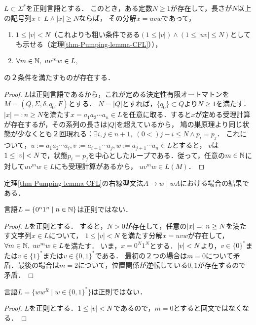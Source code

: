 \documentclass[uplatex, dvipdfmx]{jsreport}
\begin{document}
\begin{theorem}\label{thm-Pumpimg-lemma}
    $L\subset\Sigma^*$を正則言語とする．
    このとき，ある定数$N\ge 1$が存在して，長さが$N$以上の記号列$x\in L\land |x|\ge N$ならば，
    その分解$x=uvw$であって，
    \begin{enumerate}
        \item $1\le |v|<N$（これよりも粗い条件である$(1\le |v|)\land (1\le|uv|\le N)$としても示せる（定理\ref{thm-Pumping-lemma-CFL}）），
        \item $\forall m\in\mathbb{N},\; uv^mw\in L$,
    \end{enumerate}
    の２条件を満たすものが存在する．
\end{theorem}
\begin{proof}
    $L$は正則言語であるから，これが定める決定性有限オートマトンを$M=(Q,\Sigma,\delta,q_0,F)$とする．
    $N=|Q|$とすれば，$\{q_0\}\subset Q$より$N\ge 1$を満たす．
    $|x|=:n\ge N$を満たす$x=a_1a_2\cdots a_n\in L$を任意に取る．すると$x$が定める受理計算が存在するが，その系列の長さは$|Q|$を超えているから，
    鳩の巣原理より同じ状態が少なくとも２回現れる：$\exists i,j\in n+1,\;(0<)j-i\le N\land p_i=p_j$．
    これについて，$u:=a_1a_2\cdots a_i,v:=a_{i+1}\cdots a_j,w:=a_{j+1}\cdots a_n\in L$とすると，
    $v$は$1\le\lvert v\rvert< N$で，状態$p_i=p_j$を中心としたループである．従って，任意の$m\in\mathbb{N}$に対して$uv^mw\in L$にも受理計算があるから，
    $uv^mw\in L(M)$．
\end{proof}
\begin{remarks}
    定理\ref{thm-Pumping-lemma-CFL}の右線型文法$A\to w\mid wA$における場合の結果である．
\end{remarks}

\begin{corollary}
    言語$L=\{0^n1^n\mid n\in\mathbb{N}\}$は正則ではない．
\end{corollary}
\begin{proof}
    $L$を正則とする．
    すると，$N>0$が存在して，任意の$\lvert x\rvert=:n\ge N$を満たす文字列$x\in L$について，
    $1\le\lvert v\rvert<N$を満たす分解$x=uvw$が存在して，$\forall m\in\mathbb{N},\;uv^mw\in L$を満たす．
    いま，$x=0^N1^N$とする．$\lvert v\rvert<N$より，$v\in\{0\}^*$または$v\in\{1\}^*$または$v\in\{0,1\}^*$である．
    最初の２つの場合は$m=0$について矛盾．最後の場合は$m=2$について，位置関係が逆転している$0,1$が存在するので矛盾．
\end{proof}

\begin{corollary}[回文]
    言語$L=\{ww^R\mid w\in\{0,1\}^*\}$は正則ではない．
\end{corollary}
\begin{proof}
    $L$を正則とする．$1\le\lvert v\rvert<N$であるので，$m=0$とすると回文ではなくなる．
\end{proof}
\end{document}
